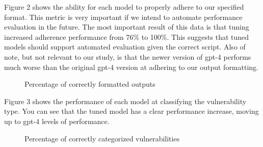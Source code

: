 \documentclass[acmsmall]{acmart}
\begin{document}
Figure 2 shows the ability for each model to properly adhere to our specified format. This metric is very important if we intend to automate performance evaluation in the future. The most important result of this data is that tuning increased adherence performance from 76\% to 100\%. This suggests that tuned models should support automated evaluation given the correct script.
Also of note, but not relevant to our study, is that the newer version of gpt-4 performs much worse than the original gpt-4 version at adhering to our output formatting.\\

\begin{figure}[htp] 
\caption{Percentage of correctly formatted outputs}
\end{figure}

Figure 3 shows the performance of each model at classifying the vulnerability type. You can see that the tuned model has a clear performance increase, moving up to gpt-4 levels of performance.\\

\begin{figure}[htp] 
  \caption{Percentage of correctly categorized vulnerabilities}
  \end{figure}
\end{document}
